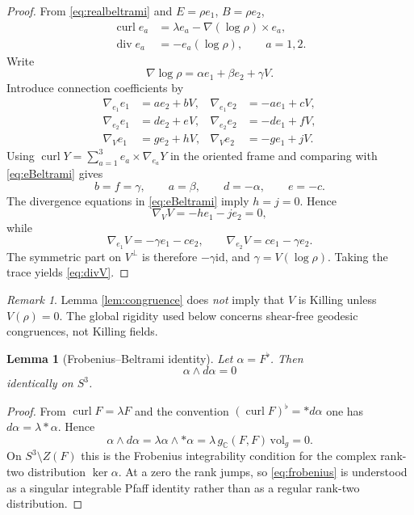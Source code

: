 \documentclass[aps,prd,reprint,nofootinbib,superscriptaddress]{revtex4-2}
\newtheorem{lemma}[theorem]{Lemma}
\theoremstyle{definition}
\theoremstyle{remark}
\newtheorem{remark}[theorem]{Remark}
\newcommand{\C}{\mathbb{C}}
\newcommand{\Div}{\operatorname{div}}
\newcommand{\Curl}{\operatorname{curl}}
\newcommand{\id}{\mathrm{id}}
\begin{document}
\begin{proof}
From \eqref{eq:realbeltrami} and $E=\rho e_1$, $B=\rho e_2$,
\begin{align}
\Curl e_a&=\lambda e_a-\nabla(\log\rho)\times e_a,\nonumber\\
\Div e_a&=-e_a(\log\rho),\qquad a=1,2.
\label{eq:eBeltrami}
\end{align}
Write
\[
\nabla\log\rho=\alpha e_1+\beta e_2+\gamma V.
\]
Introduce connection coefficients by
\begin{align*}
\nabla_{e_1}e_1&=a e_2+bV,&
\nabla_{e_1}e_2&=-a e_1+cV,\\
\nabla_{e_2}e_1&=d e_2+eV,&
\nabla_{e_2}e_2&=-d e_1+fV,\\
\nabla_Ve_1&=g e_2+hV,&
\nabla_Ve_2&=-g e_1+jV.
\end{align*}
Using $\Curl Y=\sum_{a=1}^3 e_a\times\nabla_{e_a}Y$ in the oriented frame and comparing with \eqref{eq:eBeltrami} gives
\[
b=f=\gamma,\qquad a=\beta,\qquad d=-\alpha,\qquad e=-c.
\]
The divergence equations in \eqref{eq:eBeltrami} imply $h=j=0$. Hence
\[
\nabla_VV=-h e_1-j e_2=0,
\]
while
\[
\nabla_{e_1}V=-\gamma e_1-c e_2,
\qquad
\nabla_{e_2}V=c e_1-\gamma e_2.
\]
The symmetric part on $V^\perp$ is therefore $-\gamma\id$, and $\gamma=V(\log\rho)$. Taking the trace yields \eqref{eq:divV}.
\end{proof}

\begin{remark}
Lemma \ref{lem:congruence} does \emph{not} imply that $V$ is Killing unless $V(\rho)=0$. The global rigidity used below concerns shear-free geodesic congruences, not Killing fields.
\end{remark}

\begin{lemma}[Frobenius--Beltrami identity]
\label{lem:frobenius}
Let $\alpha=F^\flat$. Then
\begin{equation}
\alpha\wedge d\alpha=0
\label{eq:frobenius}
\end{equation}
identically on $S^3$.
\end{lemma}
\begin{proof}
From $\Curl F=\lambda F$ and the convention $(\Curl F)^\flat=*d\alpha$ one has $d\alpha=\lambda *\alpha$. Hence
\[
\alpha\wedge d\alpha
=\lambda\alpha\wedge *\alpha
=\lambda\,g_{\C}(F,F)\,\mathrm{vol}_g=0.
\]
On $S^3\setminus Z(F)$ this is the Frobenius integrability condition for the complex rank-two distribution $\ker\alpha$. At a zero the rank jumps, so \eqref{eq:frobenius} is understood as a singular integrable Pfaff identity rather than as a regular rank-two distribution.
\end{proof}
\end{document}

